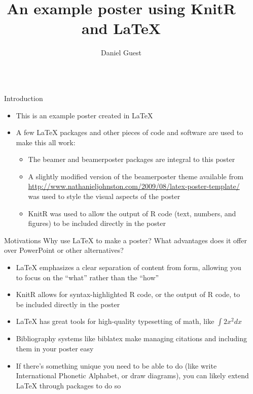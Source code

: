 \documentclass[final]{beamer}\usepackage[]{graphicx}\usepackage[]{color}
\title{An example poster using KnitR and LaTeX}
\author{Daniel Guest}
\institute{University of Minnesota, Department of Psychology, Auditory Perception and Cognition Lab}
\newlength{\sepwid}
\newlength{\onecolwid}
\begin{document}
\begin{frame}[t, fragile]
	\begin{columns}[T] %
		\begin{column}{\sepwid}\end{column} %
		\begin{column}{\onecolwid} %
				\begin{block}{Introduction}
						\begin{itemize}
							\item This is an example poster created in \LaTeX{}
							\item A few \LaTeX{} packages and other pieces of code and software are used to make this all work:
							\begin{itemize}
								\item The beamer and beamerposter packages are integral to this poster
								\item A slightly modified version of the beamerposter theme available from \url{http://www.nathanieljohnston.com/2009/08/latex-poster-template/} was used to style the visual aspects of the poster
								\item KnitR was used to allow the output of R code (text, numbers, and figures) to be included directly in the poster
							\end{itemize}
						\end{itemize}
				\end{block}
				\begin{alertblock}{Motivations}
						Why use \LaTeX{} to make a poster? What advantages does it offer over PowerPoint or other alternatives?
						\begin{itemize}
								\item LaTeX{} emphasizes a clear separation of content from form, allowing you to focus on the ``what'' rather than the ``how'' 
								\item KnitR allows for syntax-highlighted R code, or the output of R code, to be included directly in the poster 
								\item LaTeX{} has great tools for high-quality typesetting of math, like $\int 2x^2 dx$
								\item Bibliography systems like biblatex make managing citations and including them in your poster easy
								\item If there's something unique you need to be able to do (like write International Phonetic Alphabet, or draw diagrams), you can likely extend \LaTeX{} through packages to do so

\end{itemize}
\end{alertblock}
\end{column}
\end{columns}
\end{frame}
\end{document}
